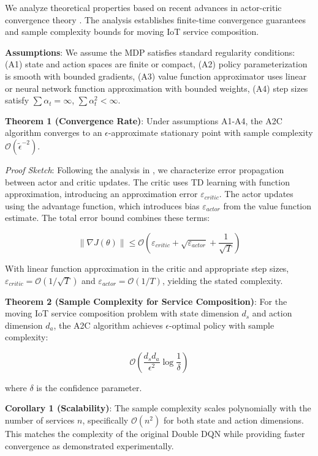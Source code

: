 \documentclass[10pt,twocolumn]{article}
\begin{document}
We analyze theoretical properties based on recent advances in
actor-critic convergence theory \nocite{liu2022}\nocite{xu2024}\nocite{liu2024b}. The analysis
establishes finite-time convergence guarantees and sample complexity
bounds for moving IoT service composition.

\textbf{Assumptions}: We assume the MDP satisfies standard regularity
conditions: (A1) state and action spaces are finite or compact, (A2)
policy parameterization is smooth with bounded gradients, (A3) value
function approximator uses linear or neural network function
approximation with bounded weights, (A4) step sizes satisfy
\(\sum \alpha_t = \infty\), \(\sum \alpha_t^2 < \infty\).

\textbf{Theorem 1 (Convergence Rate)}: Under assumptions A1-A4, the A2C
algorithm converges to an \(\epsilon\)-approximate stationary point with
sample complexity \(\mathcal{O}(\tilde{\epsilon}^{-2})\).

\emph{Proof Sketch}: Following the analysis in \nocite{liu2022}, we characterize error
propagation between actor and critic updates. The critic uses TD
learning with function approximation, introducing an approximation error
\(\varepsilon_{critic}\). The actor updates using the advantage
function, which introduces bias \(\varepsilon_{actor}\) from the value
function estimate. The total error bound combines these terms:

\[\| \nabla J(\theta) \| \leq \mathcal{O}(\varepsilon_{critic} + \sqrt{\varepsilon_{actor}} + \frac{1}{\sqrt{T}})\]

With linear function approximation in the critic and appropriate step
sizes, \(\varepsilon_{critic} = \mathcal{O}(1/\sqrt{T})\) and
\(\varepsilon_{actor} = \mathcal{O}(1/T)\), yielding the stated
complexity.

\textbf{Theorem 2 (Sample Complexity for Service Composition)}: For the
moving IoT service composition problem with state dimension \(d_s\) and
action dimension \(d_a\), the A2C algorithm achieves
\(\epsilon\)-optimal policy with sample complexity:

\[\mathcal{O}\left(\frac{d_s d_a}{\epsilon^2} \log\frac{1}{\delta}\right)\]

where \(\delta\) is the confidence parameter.

\textbf{Corollary 1 (Scalability)}: The sample complexity scales
polynomially with the number of services \(n\), specifically
\(\mathcal{O}(n^2)\) for both state and action dimensions. This matches
the complexity of the original Double DQN while providing faster
convergence as demonstrated experimentally.
\end{document}
